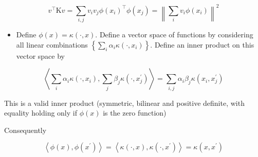 $$
v^{\top} \mathrm{K} v=\sum_{i, j} v_{i} v_{j} \phi\left(x_{i}\right)^{\top} \phi\left(x_{j}\right)=\left\|\sum_{i} v_{i} \phi\left(x_{i}\right)\right\|^{2}
$$

\begin{itemize}
  \item Define $\phi(x)=\kappa(\cdot, x)$. Define a vector space of functions by considering all linear combinations $\left\{\sum_{i} \alpha_{i} \kappa\left(\cdot, x_{i}\right)\right\}$. Define an inner product on this vector space by
\end{itemize}

$$
\left\langle\sum_{i} \alpha_{i} \kappa\left(\cdot, x_{i}\right), \sum_{j} \beta_{j} \kappa\left(\cdot, x_{j}^{\prime}\right)\right\rangle=\sum_{i, j} \alpha_{i} \beta_{j} \kappa\left(x_{i}, x_{j}^{\prime}\right)
$$

This is a valid inner product (symmetric, bilinear and positive definite, with equality holding only if $\phi(x)$ is the zero function)

Consequently

$$
\left\langle\phi(x), \phi\left(x^{\prime}\right)\right\rangle=\left\langle\kappa(\cdot, x), \kappa\left(\cdot, x^{\prime}\right)\right\rangle=\kappa\left(x, x^{\prime}\right)
$$

